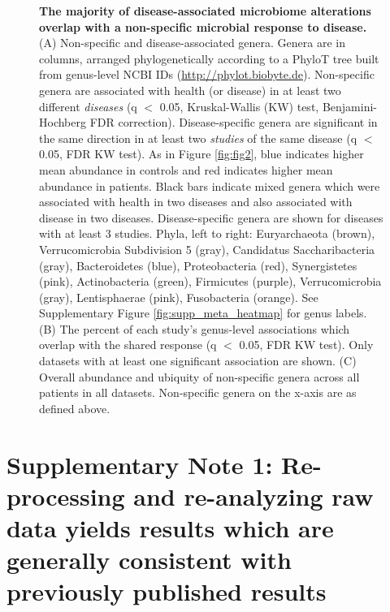 \documentclass{article}
\begin{document}
{\newpage
\begin{figure}[h]
	\begin{center}
	\caption{\textbf{The majority of disease-associated microbiome alterations overlap with a non-specific microbial response to disease.} (A) Non-specific and disease-associated genera. Genera are in columns, arranged phylogenetically according to a PhyloT tree built from genus-level NCBI IDs (\url{http://phylot.biobyte.de}). Non-specific genera are associated with health (or disease) in at least two different \textit{diseases} (q $<$ 0.05, Kruskal-Wallis (KW) test, Benjamini-Hochberg FDR correction). Disease-specific genera are significant in the same direction in at least two \textit{studies} of the same disease (q $<$ 0.05, FDR KW test). As in Figure \ref{fig:fig2}, blue indicates higher mean abundance in controls and red indicates higher mean abundance in patients. Black bars indicate mixed genera which were associated with health in two diseases and also associated with disease in two diseases. Disease-specific genera are shown for diseases with at least 3 studies. Phyla, left to right: Euryarchaeota (brown), Verrucomicrobia Subdivision 5 (gray), Candidatus Saccharibacteria (gray), Bacteroidetes (blue), Proteobacteria (red), Synergistetes (pink), Actinobacteria (green), Firmicutes (purple), Verrucomicrobia (gray), Lentisphaerae (pink), Fusobacteria (orange). See Supplementary Figure \ref{fig:supp_meta_heatmap} for genus labels. (B) The percent of each study's genus-level associations which overlap with the shared response  (q $<$ 0.05, FDR KW test). Only datasets with at least one significant association are shown. (C) Overall abundance and ubiquity of non-specific genera across all patients in all datasets. Non-specific genera on the x-axis are as defined above.}
	\label{fig:fig3}
	\end{center}
\end{figure}

\FloatBarrier

\renewcommand{\figurename}{Supplementary Figure}
\renewcommand{\tablename}{Supplementary Table}
\setcounter{figure}{0}
\setcounter{table}{0}

\section*{Supplementary Note 1: Re-processing and re-analyzing raw data yields results which are generally consistent with previously published results}\label{sec:lit_comp}

}
\end{document}
